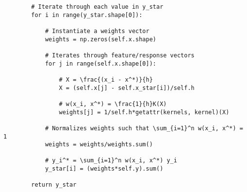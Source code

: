 \documentclass[10pt]{article}
\begin{document}
\begin{lstlisting}
        # Iterate through each value in y_star
        for i in range(y_star.shape[0]):
            
            # Instantiate a weights vector
            weights = np.zeros(self.x.shape)
            
            # Iterates through feature/response vectors
            for j in range(self.x.shape[0]):

                # X = \frac{(x_i - x^*)}{h}
                X = (self.x[j] - self.x_star[i])/self.h

                # w(x_i, x^*) = \frac{1}{h}K(X)
                weights[j] = 1/self.h*getattr(kernels, kernel)(X)

            # Normalizes weights such that \sum_{i=1}^n w(x_i, x^*) = 1    
            weights = weights/weights.sum()

            # y_i^* = \sum_{i=1}^n w(x_i, x^*) y_i
            y_star[i] = (weights*self.y).sum()

        return y_star
        \end{lstlisting}
\end{document}
